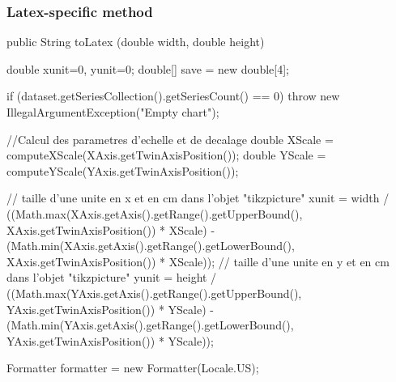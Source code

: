 \subsubsection*{Latex-specific method}

\begin{code}

   public String toLatex (double width, double height) \begin{hide} {
      double xunit=0, yunit=0;
      double[] save = new double[4];

      if (dataset.getSeriesCollection().getSeriesCount() == 0)
         throw new IllegalArgumentException("Empty chart");

      //Calcul des parametres d'echelle et de decalage
      double XScale = computeXScale(XAxis.getTwinAxisPosition());
      double YScale = computeYScale(YAxis.getTwinAxisPosition());

      // taille d'une unite en x et en cm dans l'objet "tikzpicture"
      xunit = width / ((Math.max(XAxis.getAxis().getRange().getUpperBound(), XAxis.getTwinAxisPosition()) * XScale) - (Math.min(XAxis.getAxis().getRange().getLowerBound(), XAxis.getTwinAxisPosition()) * XScale));
      // taille d'une unite en y et en cm dans l'objet "tikzpicture"
      yunit = height / ((Math.max(YAxis.getAxis().getRange().getUpperBound(), YAxis.getTwinAxisPosition()) * YScale) - (Math.min(YAxis.getAxis().getRange().getLowerBound(), YAxis.getTwinAxisPosition()) * YScale));

      Formatter formatter = new Formatter(Locale.US);

}
\end{hide}
\end{code}
